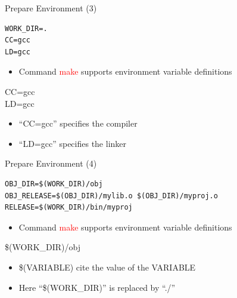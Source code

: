 \begin{frame}[fragile]{Prepare Environment (3)}
\lstset{language=[gnu] make}
\begin{lstlisting}[linewidth=0.9\linewidth, xleftmargin=0.05\linewidth, caption=Makefile]
WORK_DIR=.
CC=gcc
LD=gcc
\end{lstlisting}
\vspace{-0.2in}
\begin{itemize}
	\item {Command \textcolor{red}{make} supports environment variable definitions }
\end{itemize}
\begin{center}
	\Large{CC=gcc}\\
	\Large{LD=gcc}
\end{center}
\begin{itemize}
	\item {``CC=gcc'' specifies the compiler}
	\item {``LD=gcc'' specifies the linker}
\end{itemize}
\end{frame}

\begin{frame}[fragile]{Prepare Environment (4)}
\vspace{-0.2in}
\lstset{language=[gnu] make}
\begin{lstlisting}[linewidth=0.9\linewidth, xleftmargin=0.05\linewidth, caption=Makefile]
OBJ_DIR=$(WORK_DIR)/obj
OBJ_RELEASE=$(OBJ_DIR)/mylib.o $(OBJ_DIR)/myproj.o
RELEASE=$(WORK_DIR)/bin/myproj
\end{lstlisting}
\vspace{-0.2in}
\begin{itemize}
	\item {Command \textcolor{red}{make} supports environment variable definitions }
\end{itemize}
\begin{center}
	\Large{\$(WORK\_DIR)/obj}
\end{center}
\vspace{-0.2in}
\begin{itemize}
	\item {\$(VARIABLE) cite the value of the VARIABLE}
	\item {Here ``\$(WORK\_DIR)'' is replaced by ``./''}
\end{itemize}
\end{frame}



